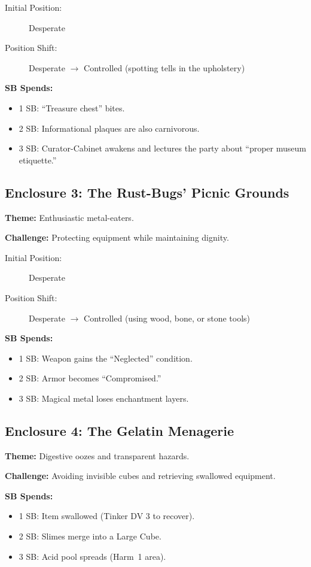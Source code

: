 \begin{description}
  \item[Initial Position:] Desperate
  \item[Position Shift:] Desperate $\rightarrow$ Controlled (spotting tells in the upholstery)
\end{description}

\textbf{SB Spends:}
\begin{itemize}
  \item 1 SB: ``Treasure chest'' bites.
  \item 2 SB: Informational plaques are also carnivorous.
  \item 3 SB: Curator-Cabinet awakens and lectures the party about ``proper museum etiquette.''
\end{itemize}

\subsection{Enclosure 3: The Rust-Bugs' Picnic Grounds}
\textbf{Theme:} Enthusiastic metal-eaters.

\textbf{Challenge:} Protecting equipment while maintaining dignity.

\begin{description}
  \item[Initial Position:] Desperate
  \item[Position Shift:] Desperate $\rightarrow$ Controlled (using wood, bone, or stone tools)
\end{description}

\textbf{SB Spends:}
\begin{itemize}
  \item 1 SB: Weapon gains the ``Neglected'' condition.
  \item 2 SB: Armor becomes ``Compromised.''
  \item 3 SB: Magical metal loses enchantment layers.
\end{itemize}

\subsection{Enclosure 4: The Gelatin Menagerie}
\textbf{Theme:} Digestive oozes and transparent hazards.

\textbf{Challenge:} Avoiding invisible cubes and retrieving swallowed equipment.

\textbf{SB Spends:}
\begin{itemize}
  \item 1 SB: Item swallowed (Tinker DV 3 to recover).
  \item 2 SB: Slimes merge into a Large Cube.
  \item 3 SB: Acid pool spreads (Harm~1 area).
\end{itemize}

